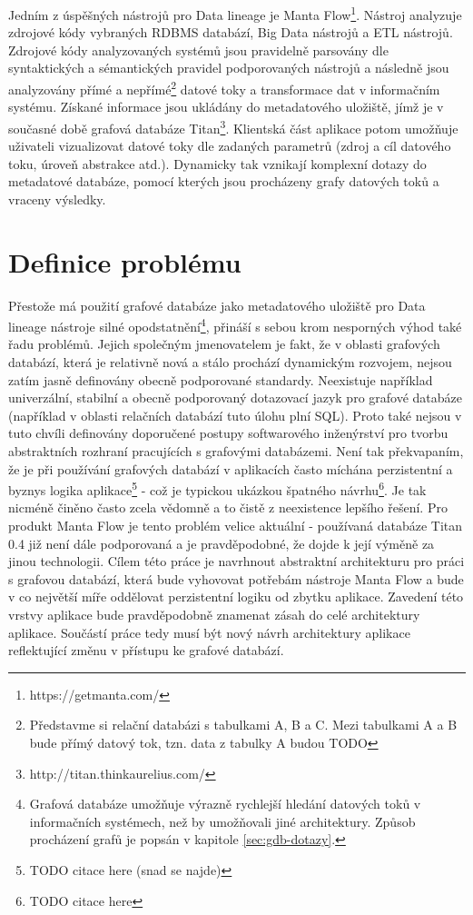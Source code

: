 Jedním z úspěšných nástrojů pro Data lineage je Manta Flow\footnote{https://getmanta.com/}. Nástroj analyzuje zdrojové kódy vybraných RDBMS databází, Big Data nástrojů a ETL nástrojů. 
Zdrojové kódy analyzovaných systémů jsou pravidelně parsovány dle syntaktických a sémantických pravidel podporovaných nástrojů a následně jsou analyzovány přímé a nepřímé\footnote{Představme si relační databázi s tabulkami A, B a C. Mezi tabulkami A a B bude přímý datový tok, tzn. data z tabulky A budou TODO} datové toky a transformace dat v informačním systému. Získané informace jsou ukládány do metadatového uložiště, jímž je v současné době grafová databáze Titan\footnote{http://titan.thinkaurelius.com/}. Klientská část aplikace potom umožňuje uživateli vizualizovat datové toky dle zadaných parametrů (zdroj a cíl datového toku, úroveň abstrakce atd.). Dynamicky tak vznikají komplexní dotazy do metadatové databáze, pomocí kterých jsou procházeny grafy datových toků a vraceny výsledky.    

\section{Definice problému}
Přestože má použití grafové databáze jako metadatového uložiště pro Data lineage nástroje silné opodstatnění\footnote{Grafová databáze umožňuje výrazně rychlejší hledání datových toků v informačních systémech, než by umožňovali jiné architektury. Způsob procházení grafů je popsán v kapitole \ref{sec:gdb-dotazy}.}, přináší s sebou krom nesporných výhod také řadu problémů. Jejich společným jmenovatelem je fakt, že v oblasti grafových databází, která je relativně nová a stálo prochází dynamickým rozvojem, nejsou zatím jasně definovány obecně podporované standardy. Neexistuje například univerzální, stabilní a obecně podporovaný dotazovací jazyk pro grafové databáze (například v oblasti relačních databází tuto úlohu plní SQL). Proto také nejsou v tuto chvíli definovány doporučené postupy softwarového inženýrství pro tvorbu abstraktních rozhraní pracujících s grafovými databázemi. Není tak překvapaním, že je při používání grafových databází v aplikacích často míchána perzistentní a byznys logika aplikace\footnote{TODO citace here (snad se najde)} - což je typickou ukázkou špatného návrhu\footnote{TODO citace here}. Je tak nicméně činěno často zcela vědomně a to čistě z neexistence lepšího řešení. Pro produkt Manta Flow je tento problém velice aktuální - používaná databáze Titan 0.4 již není dále podporovaná \cite{Titan04} a je pravděpodobné, že dojde k její výměně za jinou technologii. Cílem této práce je navrhnout abstraktní architekturu pro práci s grafovou databází, která bude vyhovovat potřebám nástroje Manta Flow a bude v co největší míře oddělovat perzistentní logiku od zbytku aplikace. Zavedení této vrstvy aplikace bude pravděpodobně znamenat zásah do celé architektury aplikace. Součástí práce tedy musí být nový návrh architektury aplikace reflektující změnu v přístupu ke grafové databází. 

